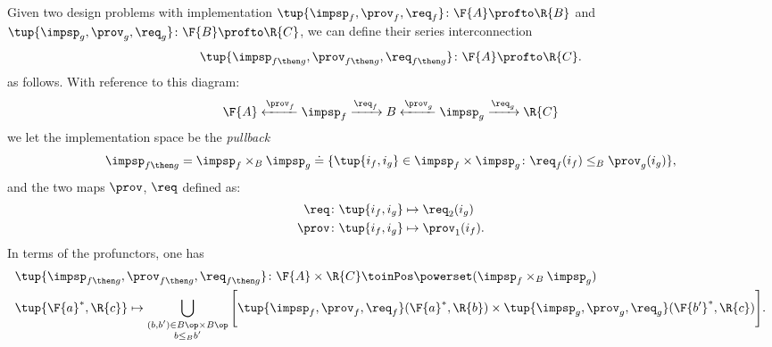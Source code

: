 \begin{definition}
    \label{def:seriesdpi}
    Given two design problems with implementation $\tup{\impsp_f,\prov_f,\req_f}\colon \F{A}\profto \R{B}$
    and $\tup{\impsp_g,\prov_g,\req_g}\colon \F{B}\profto \R{C}$, we can define their
    series interconnection
    \begin{equation*}
        \tup{\impsp_{f\then g},\prov_{f\then g},\req_{f\then g}}\colon \F{A}\profto \R{C}.
    \end{equation*}
    as follows. With reference to this diagram:
    \begin{equation}
        \F{A} \xleftarrow{\prov_f} \impsp_f \xrightarrow{\req_f} B
        \xleftarrow{\prov_g} \impsp_g \xrightarrow{\req_g} \R{C}
    \end{equation}
    we let the implementation space be the \emph{pullback}
    \begin{equation}
        \begin{aligned}
            \impsp_{f\then g}&= \impsp_f \times_B \impsp_g \doteq \{
            \tup{i_f,i_g} \in \impsp_f \times \impsp_g \colon
            \req_f(i_f) \leq_{B} \prov_g(i_g)
            \},\\
        \end{aligned}
    \end{equation}
    and the two maps $\prov$, $\req$ defined as:
    \begin{equation}
        \begin{aligned}
            \req  &\colon \tup{i_f,i_g} \mapsto \req_2(i_g)\\
            \prov  &\colon  \tup{i_f,i_g} \mapsto \prov_1(i_f).
        \end{aligned}
    \end{equation}
    In terms of the profunctors, one has
    \begin{equation}
        \label{eq:seriesdpi}
        \begin{aligned}
            &\tup{\impsp_{f\then g},\prov_{f\then g},\req_{f\then g}}\colon \F{A}\times \R{C} \toinPos \powerset(\impsp_f \times_B \impsp_g) \\
            &\tup{\F{a}^*,\R{c}} \mapsto \bigcup_{\substack{(b,b') \in B\op \times B\op \\ b \leq_B b'}} \Bigg[ \tup{\impsp_f,\prov_f,\req_f}(\F{a}^*,\R{b}) \times \tup{\impsp_g,\prov_g,\req_g}(\F{b'}^*,\R{c}) \Bigg].
        \end{aligned}
    \end{equation}
\end{definition}

